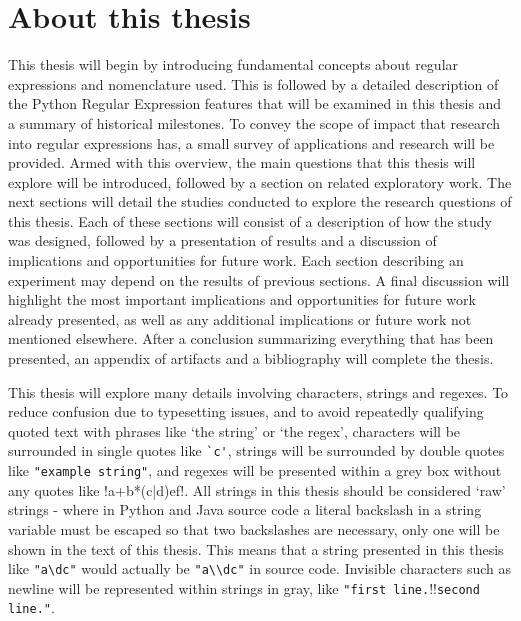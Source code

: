\section{About this thesis}
This thesis will begin by introducing fundamental concepts about regular expressions and nomenclature used.  This is followed by a detailed description of the Python Regular Expression features that will be examined in this thesis and a summary of historical milestones.  To convey the scope of impact that research into regular expressions has, a small survey of applications and research will be provided.  Armed with this overview, the main questions that this thesis will explore will be introduced, followed by a section on related exploratory work.  The next  sections will detail the studies conducted to explore the research questions of this thesis.  Each of these sections will consist of a description of how the study was designed, followed by a presentation of results and a discussion of implications and opportunities for future work.
Each section describing an experiment may depend on the results of previous sections.  A final discussion will highlight the most important implications and opportunities for future work already presented, as well as any additional implications or future work not mentioned elsewhere.  After a conclusion summarizing everything that has been presented, an appendix of artifacts and a bibliography will complete the thesis.

This thesis will explore many details involving characters, strings and regexes.  To reduce confusion due to typesetting issues, and to avoid repeatedly qualifying quoted text with phrases like `the string' or `the regex', characters will be surrounded in single quotes like \verb!`c'!, strings will be surrounded by double quotes like \verb!"example string"!, and regexes will be presented within a grey box without any quotes like \cverb!a+b*(c|d)e\1f!.  All strings in this thesis should be considered `raw' strings - where in Python and Java source code a literal backslash in a string variable must be escaped so that two backslashes are necessary, only one will be shown in the text of this thesis.  This means that a string presented in this thesis like \verb!"a\dc"! would actually be \verb!"a\\dc"! in source code.  Invisible characters such as newline will be represented within strings in gray,
like \verb!"first line.!\gverb!\n!\verb!second line."!.


